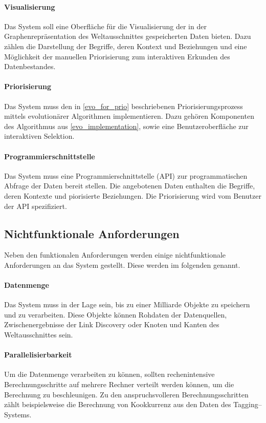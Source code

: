 \paragraph{Visualisierung} Das System soll eine Oberfläche für die Visualisierung der in der Graphenrepräsentation des Weltausschnittes gespeicherten Daten bieten. Dazu zählen die Darstellung der Begriffe, deren Kontext und Beziehungen und eine Möglichkeit der manuellen Priorisierung zum interaktiven Erkunden des Datenbestandes.

\paragraph{Priorisierung} Das System muss den in \cref{evo_for_prio} beschriebenen Priorisierungsprozess mittels evolutionärer Algorithmen implementieren. Dazu gehören Komponenten des Algorithmus aus \cref{evo_implementation}, sowie eine Benutzeroberfläche zur interaktiven Selektion.

\paragraph{Programmierschnittstelle} Das System muss eine Programmierschnittstelle (API) zur programmatischen Abfrage der Daten bereit stellen. Die angebotenen Daten enthalten die Begriffe, deren Kontexte und piorisierte Beziehungen. Die Priorisierung wird vom Benutzer der API spezifiziert.

\subsection{Nichtfunktionale Anforderungen}

Neben den funktionalen Anforderungen werden einige nichtfunktionale Anforderungen an das System gestellt. Diese werden im folgenden genannt.

\paragraph{Datenmenge} Das System muss in der Lage sein, bis zu einer Milliarde Objekte zu speichern und zu verarbeiten. Diese Objekte können Rohdaten der Datenquellen, Zwischenergebnisse der Link Discovery oder Knoten und Kanten des Weltausschnittes sein.

\paragraph{Parallelisierbarkeit} Um die Datenmenge verarbeiten zu können, sollten rechenintensive Berechnungsschritte auf mehrere Rechner verteilt werden können, um die Berechnung zu beschleunigen. Zu den anspruchsvolleren Berechnungsschritten zählt beispielsweise die Berechnung von Kookkurrenz aus den Daten des Tagging--Systems.

